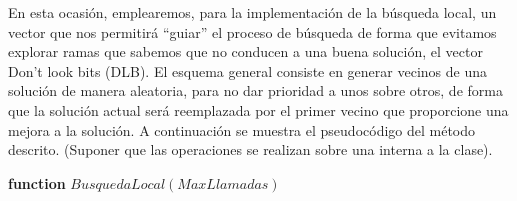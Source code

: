\documentclass[11pt,a4paper]{article}
\begin{document}
	\noindent En esta ocasión, emplearemos, para la implementación de la búsqueda local, un vector que nos permitirá ``guiar'' el proceso de búsqueda de forma que evitamos explorar ramas que sabemos que no conducen a una buena solución, el vector Don't look bits (DLB). El esquema general consiste en generar vecinos de una solución de manera aleatoria, para no dar prioridad a unos sobre otros, de forma que la solución actual será reemplazada por el primer vecino que proporcione una mejora a la solución. A continuación se muestra el pseudocódigo del método descrito. (Suponer que las operaciones se realizan sobre una interna a la clase).

	\begin{algorithm} [!h]
		
		\textbf{function} $BusquedaLocal(MaxLlamadas)$
		
	\end{algorithm}
\end{document}
